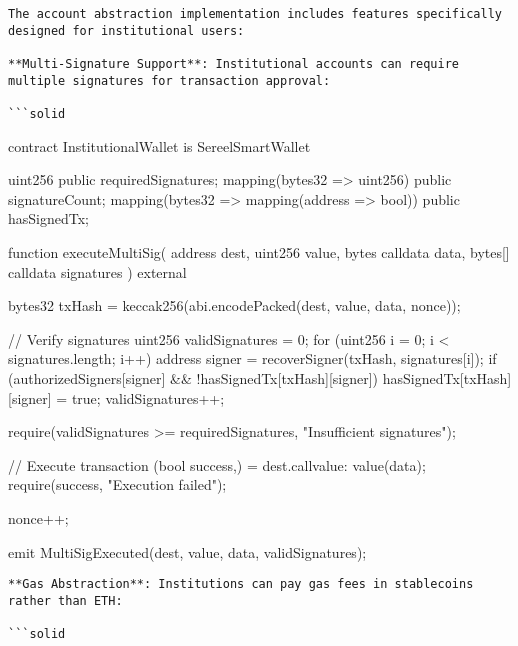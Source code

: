 \documentclass[12pt]{article}
\begin{document}
\begin{lstlisting}
The account abstraction implementation includes features specifically designed for institutional users:

**Multi-Signature Support**: Institutional accounts can require multiple signatures for transaction approval:

```solid
\end{lstlisting}
contract InstitutionalWallet is SereelSmartWallet {    uint256 public requiredSignatures;    mapping(bytes32 => uint256) public signatureCount;    mapping(bytes32 => mapping(address => bool)) public hasSignedTx;

    function executeMultiSig(        address dest,        uint256 value,        bytes calldata data,        bytes[] calldata signatures    ) external {        bytes32 txHash = keccak256(abi.encodePacked(dest, value, data, nonce));

        // Verify signatures        uint256 validSignatures = 0;        for (uint256 i = 0; i < signatures.length; i++) {            address signer = recoverSigner(txHash, signatures[i]);            if (authorizedSigners[signer] && !hasSignedTx[txHash][signer]) {                hasSignedTx[txHash][signer] = true;                validSignatures++;            }        }

        require(validSignatures >= requiredSignatures, "Insufficient signatures");

        // Execute transaction        (bool success,) = dest.call{value: value}(data);        require(success, "Execution failed");

        nonce++;

        emit MultiSigExecuted(dest, value, data, validSignatures);    }}
\begin{lstlisting}
**Gas Abstraction**: Institutions can pay gas fees in stablecoins rather than ETH:

```solid
\end{lstlisting}
\end{document}
